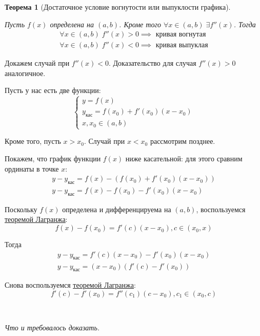 \documentclass[a4paper,12pt,oneside]{extbook}
\newcommand{\newpar}{$ $\par\nobreak\ignorespaces}
\theoremstyle{numbered}
\theoremstyle{unnumbered}
\theoremstyle{named}
\newtheorem{theorem}{Теорема}[section]
\theoremstyle{unnumbered}
\theoremstyle{named}
\theoremstyle{named}
\theoremstyle{named}
\renewenvironment{proof}[1][]{\breakenv[Доказательство]{\if\relax\detokenize{#1}\relax\else\;\fi}{\textbf{#1}}}{\smallskip\newpar \hfill\textit{Что и требовалось доказать.}}
\newcommand{\plink}[2]{\hyperref[#1]{\color{blue}\underline{#2}}}
\begin{document}
\begin{theorem}[Достаточное условие вогнутости или выпуклости графика]
    \label{theorem:Достаточное условие вогнутости или выпуклости графика}
    \newpar
    Пусть \(f(x)\) определена на \((a, b)\). Кроме того \(\forall x \in (a, b) \; \exists f''(x)\). Тогда
    \begin{gather*}
        \forall x \in (a, b) \; f''(x) > 0 \implies \text{ кривая вогнутая} \\
        \forall x \in (a, b) \; f''(x) < 0 \implies \text{ кривая выпуклая}
    \end{gather*}
\end{theorem}

\begin{proof}
    Докажем случай при \(f''(x) < 0\). Доказательство для случая \(f''(x) > 0\) аналогичное.

    Пусть у нас есть две функции:
    \[
        \begin{cases}
            y = f(x)                                   \\
            y_{\text{кас}} = f(x_0) + f'(x_0)(x - x_0) \\
            x, x_0 \in (a, b)
        \end{cases}
    \]

    Кроме того, пусть \(x > x_0\). Случай при \(x < x_0\) рассмотрим позднее.

    Покажем, что график функции \(f(x)\) ниже касательной: для этого сравним ординаты в точке \(x\):
    \begin{gather*}
        y - y_{\text{кас}} = f(x) - (f(x_0) + f'(x_0)(x - x_0)) \\
        y - y_{\text{кас}} = f(x) - f(x_0) - f'(x_0)(x - x_0)
    \end{gather*}

    Поскольку \(f(x)\) определена и дифференцируема на \((a, b)\), воспользуемся \plink{theorem:Теорема Лагранжа}{теоремой Лагранжа}:
    \[
        f(x) - f(x_0) = f'(c)(x - x_0), c \in (x_0, x)
    \]

    Тогда
    \begin{gather*}
        y - y_{\text{кас}} = f'(c)(x - x_0) - f'(x_0)(x - x_0) \\
        y - y_{\text{кас}} = (x - x_0)(f'(c) - f'(x_0))
    \end{gather*}

    Снова воспользуемся \plink{theorem:Теорема Лагранжа}{теоремой Лагранжа}:
    \[
        f'(c) - f'(x_0) = f''(c_1)(c - x_0), c_1 \in (x_0, c)
    \]


\end{proof}
\end{document}
